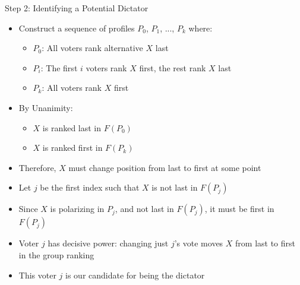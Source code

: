 \documentclass[10pt]{beamer}
\begin{document}
\begin{frame}{Step 2: Identifying a Potential Dictator}
  \begin{itemize}[<+->]
    \item Construct a sequence of profiles $P_0$, $P_1$, ..., $P_k$ where:
      \begin{itemize}
        \item $P_0$: All voters rank alternative $X$ last
        \item $P_i$: The first $i$ voters rank $X$ first, the rest rank $X$ last
        \item $P_k$: All voters rank $X$ first
      \end{itemize}
    \item By Unanimity:
      \begin{itemize}
        \item $X$ is ranked last in $F(P_0)$
        \item $X$ is ranked first in $F(P_k)$
      \end{itemize}
    \item Therefore, $X$ must change position from last to first at some point
    \item Let $j$ be the first index such that $X$ is not last in $F(P_j)$
    \item Since $X$ is polarizing in $P_j$, and not last in $F(P_j)$, it must be first in $F(P_j)$
    \item Voter $j$ has decisive power: changing just $j$'s vote moves $X$ from last to first in the group ranking
    \item This voter $j$ is our candidate for being the dictator
  \end{itemize}
\end{frame}
\end{document}
